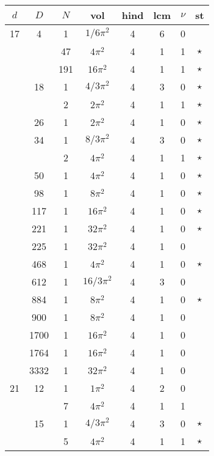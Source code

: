 \documentclass[12pt]{amsart}
\providecommand{\DIFadd}[1]{{\protect\color{blue}\uwave{#1}}} %
\providecommand{\DIFdel}[1]{{\protect\color{red}\sout{#1}}}                      %
\providecommand{\DIFaddbegin}{} %
\providecommand{\DIFaddend}{} %
\providecommand{\DIFdelbegin}{} %
\providecommand{\DIFdelend}{} %
\begin{document}
\begin{tabular}{ccc|ccccc}
$d$ & $D$ & $N$ & vol & hind & lcm & $\nu$ & st\\
\hline
17 & 4 & 1 & \DIFdelbegin \DIFdel{$1/6\pi^2$ }\DIFdelend \DIFaddbegin \DIFadd{$(1/6)\pi^2$ }\DIFaddend & 4 & 6 & 0 &  \\
 &  & 47 & $4\pi^2$ & 4 & 1 & 1 & $\star$ \\
 &  & 191 & $16\pi^2$ & 4 & 1 & 1 & $\star$ \\
 & 18 & 1 & \DIFdelbegin \DIFdel{$4/3\pi^2$ }\DIFdelend \DIFaddbegin \DIFadd{$(4/3)\pi^2$ }\DIFaddend & 4 & 3 & 0 & $\star$ \\
 &  & 2 & $2\pi^2$ & 4 & 1 & 1 & $\star$ \\
 & 26 & 1 & $2\pi^2$ & 4 & 1 & 0 & $\star$ \\
 & 34 & 1 & \DIFdelbegin \DIFdel{$8/3\pi^2$ }\DIFdelend \DIFaddbegin \DIFadd{$(8/3)\pi^2$ }\DIFaddend & 4 & 3 & 0 & $\star$ \\
 &  & 2 & $4\pi^2$ & 4 & 1 & 1 & $\star$ \\
 & 50 & 1 & $4\pi^2$ & 4 & 1 & 0 & $\star$ \\
 & 98 & 1 & $8\pi^2$ & 4 & 1 & 0 & $\star$ \\
 & 117 & 1 & $16\pi^2$ & 4 & 1 & 0 & $\star$ \\
 & 221 & 1 & $32\pi^2$ & 4 & 1 & 0 & $\star$ \\
 & 225 & 1 & $32\pi^2$ & 4 & 1 & 0 &  \\
 & 468 & 1 & $4\pi^2$ & 4 & 1 & 0 & $\star$ \\
 & 612 & 1 & \DIFdelbegin \DIFdel{$16/3\pi^2$ }\DIFdelend \DIFaddbegin \DIFadd{$(16/3)\pi^2$ }\DIFaddend & 4 & 3 & 0 &  \\
 & 884 & 1 & $8\pi^2$ & 4 & 1 & 0 & $\star$ \\
 & 900 & 1 & $8\pi^2$ & 4 & 1 & 0 &  \\
 & 1700 & 1 & $16\pi^2$ & 4 & 1 & 0 &  \\
 & 1764 & 1 & $16\pi^2$ & 4 & 1 & 0 &  \\
 & 3332 & 1 & $32\pi^2$ & 4 & 1 & 0 &  \\
21 & 12 & 1 & \DIFdelbegin \DIFdel{$1\pi^2$ }\DIFdelend \DIFaddbegin \DIFadd{$\pi^2$ }\DIFaddend & 4 & 2 & 0 &  \\
 &  & 7 & $4\pi^2$ & 4 & 1 & 1 &  \\
 & 15 & 1 & \DIFdelbegin \DIFdel{$4/3\pi^2$ }\DIFdelend \DIFaddbegin \DIFadd{$(4/3)\pi^2$ }\DIFaddend & 4 & 3 & 0 & $\star$ \\
 &  & 5 & $4\pi^2$ & 4 & 1 & 1 & $\star$ \\

\end{tabular}
\end{document}
